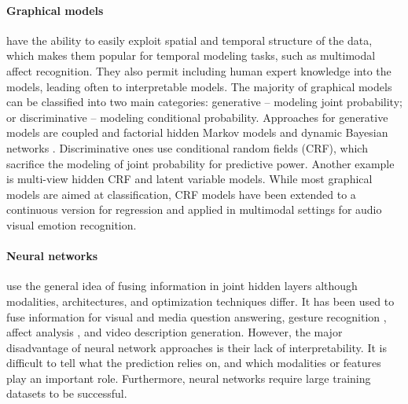 \paragraph{Graphical models} have the ability to easily exploit spatial and temporal structure of the data, which makes them popular for temporal modeling tasks, such as multimodal affect recognition. They also permit including human expert knowledge into the models, leading often to interpretable models. The majority of graphical models can be classified into two main categories: generative -- modeling joint probability;
or discriminative -- modeling conditional probability. Approaches for generative models are coupled and factorial hidden Markov models \cite{Ghahramani1996factorial} and
dynamic Bayesian networks \cite{Garg2003boosted}. Discriminative ones use conditional random fields (CRF), which sacrifice the modeling of joint probability for predictive
power. Another example is multi-view hidden
CRF \cite{Song2012multimodal} and latent variable models. While most graphical models are aimed at classification, CRF models have been extended to a continuous
version for regression and applied in multimodal
settings \cite{Baltruvsaitis2013dimensional} for audio visual emotion recognition.


\paragraph{Neural networks} use the general idea of fusing information in joint hidden layers although 
modalities, architectures, and optimization techniques differ. It has been used to fuse
information for visual and media question answering, gesture recognition \cite{Neverova2016moddrop}, affect analysis \cite{Nojavanasghari2016deep}, and video description generation. However, the major disadvantage of neural network approaches is their lack of interpretability. It is difficult to tell what the prediction relies on, and which modalities or features play an important role. Furthermore, neural networks require large training datasets to be successful.

